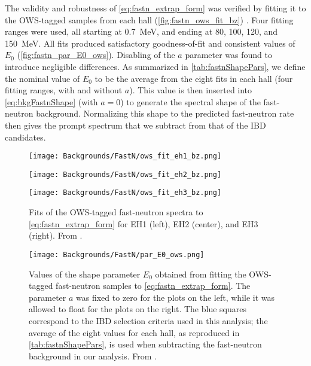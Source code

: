 \documentclass[../thesis.tex]{subfiles}
\begin{document}
The validity and robustness of \autoref{eq:fastn_extrap_form} was verified by fitting it to the OWS-tagged samples from each hall (\autoref{fig:fastn_ows_fit_bz}) \cite{fastn}. Four fitting ranges were used, all starting at 0.7~MeV, and ending at 80, 100, 120, and 150~MeV. All fits produced satisfactory goodness-of-fit and consistent values of $E_0$ (\autoref{fig:fastn_par_E0_ows}). Disabling of the $a$ parameter was found to introduce negligible differences. As summarized in \autoref{tab:fastnShapePars}, we define the nominal value of $E_0$ to be the average from the eight fits in each hall (four fitting ranges, with and without $a$). This value is then inserted into \autoref{eq:bkgFastnShape} (with $a = 0$) to generate the spectral shape of the fast-neutron background. Normalizing this shape to the predicted fast-neutron rate then gives the prompt spectrum that we subtract from that of the IBD candidates.

\begin{figure}[ht]
  \begin{minipage}{0.333\textwidth}%
    \texttt{[image: Backgrounds/FastN/ows\_fit\_eh1\_bz.png]}%
  \end{minipage}%
  \begin{minipage}{0.333\textwidth}%
    \texttt{[image: Backgrounds/FastN/ows\_fit\_eh2\_bz.png]}%
  \end{minipage}%
  \begin{minipage}{0.333\textwidth}%
    \texttt{[image: Backgrounds/FastN/ows\_fit\_eh3\_bz.png]}%
  \end{minipage}%
  \caption{Fits of the OWS-tagged fast-neutron spectra to \autoref{eq:fastn_extrap_form} for EH1 (left), EH2 (center), and EH3 (right). From \cite{fastn}.}
  \label{fig:fastn_ows_fit_bz}
\end{figure}

\begin{figure}[ht]
  \texttt{[image: Backgrounds/FastN/par\_E0\_ows.png]}
  \caption{Values of the shape parameter $E_0$ obtained from fitting the OWS-tagged fast-neutron samples to \autoref{eq:fastn_extrap_form}. The parameter $a$ was fixed to zero for the plots on the left, while it was allowed to float for the plots on the right. The blue squares correspond to the IBD selection criteria used in this analysis; the average of the eight values for each hall, as reproduced in \autoref{tab:fastnShapePars}, is used when subtracting the fast-neutron background in our analysis. From \cite{fastn}.}
  \label{fig:fastn_par_E0_ows}
\end{figure}
\end{document}

